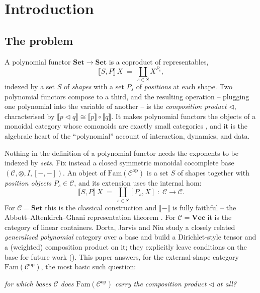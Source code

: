 \documentclass[11pt]{amsart}
\theoremstyle{plain}
\theoremstyle{definition}
\newcommand{\C}{\mathcal{C}}
\newcommand{\Fam}{\mathrm{Fam}}
\newcommand{\ext}[1]{\llbracket #1 \rrbracket}
\newcommand{\Setb}{\mathbf{Set}}
\newcommand{\Vecb}{\mathbf{Vec}}
\newcommand{\op}{\mathrm{op}}
\newcommand{\comp}{\mathbin{\triangleleft}}
\begin{document}
\maketitle

\section{Introduction}

\subsection*{The problem}
A polynomial functor $\Setb\to\Setb$ is a coproduct of representables,
\[
   \ext{S,P}\,X \;=\; \coprod_{s\in S} X^{P_s},
\]
indexed by a set $S$ of \emph{shapes} with a set $P_s$ of \emph{positions} at each shape.
Two polynomial functors compose to a third, and the resulting operation -- plugging one polynomial
into the variable of another -- is the \emph{composition product} $\comp$, characterised by
$\ext{p\comp q}\cong\ext p\circ\ext q$. It makes polynomial functors the objects of a monoidal
category whose comonoids are exactly small categories \cite{NiuSpivak,DJN}, and it is the algebraic
heart of the ``polynomial'' account of interaction, dynamics, and data.

Nothing in the definition of a polynomial functor needs the exponents to be indexed by \emph{sets}.
Fix instead a closed symmetric monoidal cocomplete base $(\C,\otimes,I,[-,-])$. An object of
$\Fam(\C^{\op})$ is a set $S$ of shapes together with \emph{position objects} $P_s\in\C$, and its
extension uses the internal hom:
\[
   \ext{S,P}\,X \;=\; \coprod_{s\in S}[P_s,X]\;:\;\C\to\C .
\]
For $\C=\Setb$ this is the classical construction and $\ext{-}$ is fully faithful -- the
Abbott--Altenkirch--Ghani representation theorem \cite{AAG}. For $\C=\Vecb$ it is the category of
linear containers. Dorta, Jarvis and Niu \cite{DJN} study a closely related \emph{generalised
polynomial} category over a base and build a Dirichlet-style tensor and a (weighted) composition
product on it; they explicitly leave conditions on the base for future work
(\cite[\S6]{DJN}). This paper answers, for the external-shape category $\Fam(\C^{\op})$, the most
basic such question:
\begin{center}
\emph{for which bases $\C$ does $\Fam(\C^{\op})$ carry the composition product $\comp$ at all?}
\end{center}
\end{document}
